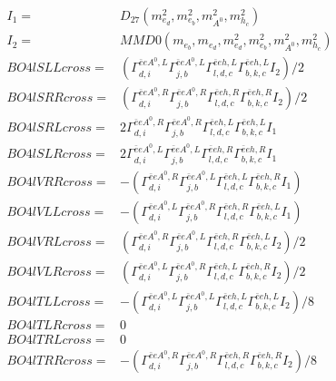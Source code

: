 \documentclass[A4,landscape]{article}
\begin{document}
\begin{align} 
I_1 = & D_{27}(m^2_{e_{{d}}}, m^2_{e_{{b}}}, m^2_{A^0}, m^2_{h_{{c}}}) \\ 
I_2 = & MMD0(m_{e_{{b}}}, m_{e_{{d}}}, m^2_{e_{{d}}}, m^2_{e_{{b}}}, m^2_{A^0}, m^2_{h_{{c}}}) \\ 
  BO4lSLLcross= & ( \Gamma^{\bar{e}e A^0 ,L}_{d, i} \Gamma^{\bar{e}e A^0 ,L}_{j, b} \Gamma^{\bar{e}e h ,L}_{l, d, c} \Gamma^{\bar{e}e h ,L}_{b, k, c} I_2)/2 \\ 
  BO4lSRRcross= & ( \Gamma^{\bar{e}e A^0 ,R}_{d, i} \Gamma^{\bar{e}e A^0 ,R}_{j, b} \Gamma^{\bar{e}e h ,R}_{l, d, c} \Gamma^{\bar{e}e h ,R}_{b, k, c} I_2)/2 \\ 
  BO4lSRLcross= & 2  \Gamma^{\bar{e}e A^0 ,R}_{d, i} \Gamma^{\bar{e}e A^0 ,R}_{j, b} \Gamma^{\bar{e}e h ,L}_{l, d, c} \Gamma^{\bar{e}e h ,L}_{b, k, c} I_1 \\ 
  BO4lSLRcross= & 2  \Gamma^{\bar{e}e A^0 ,L}_{d, i} \Gamma^{\bar{e}e A^0 ,L}_{j, b} \Gamma^{\bar{e}e h ,R}_{l, d, c} \Gamma^{\bar{e}e h ,R}_{b, k, c} I_1 \\ 
  BO4lVRRcross= & -( \Gamma^{\bar{e}e A^0 ,R}_{d, i} \Gamma^{\bar{e}e A^0 ,L}_{j, b} \Gamma^{\bar{e}e h ,L}_{l, d, c} \Gamma^{\bar{e}e h ,R}_{b, k, c} I_1) \\ 
  BO4lVLLcross= & -( \Gamma^{\bar{e}e A^0 ,L}_{d, i} \Gamma^{\bar{e}e A^0 ,R}_{j, b} \Gamma^{\bar{e}e h ,R}_{l, d, c} \Gamma^{\bar{e}e h ,L}_{b, k, c} I_1) \\ 
  BO4lVRLcross= & ( \Gamma^{\bar{e}e A^0 ,R}_{d, i} \Gamma^{\bar{e}e A^0 ,L}_{j, b} \Gamma^{\bar{e}e h ,R}_{l, d, c} \Gamma^{\bar{e}e h ,L}_{b, k, c} I_2)/2 \\ 
  BO4lVLRcross= & ( \Gamma^{\bar{e}e A^0 ,L}_{d, i} \Gamma^{\bar{e}e A^0 ,R}_{j, b} \Gamma^{\bar{e}e h ,L}_{l, d, c} \Gamma^{\bar{e}e h ,R}_{b, k, c} I_2)/2 \\ 
  BO4lTLLcross= & -( \Gamma^{\bar{e}e A^0 ,L}_{d, i} \Gamma^{\bar{e}e A^0 ,L}_{j, b} \Gamma^{\bar{e}e h ,L}_{l, d, c} \Gamma^{\bar{e}e h ,L}_{b, k, c} I_2)/8 \\ 
  BO4lTLRcross= & 0 \\ 
  BO4lTRLcross= & 0 \\ 
  BO4lTRRcross= & -( \Gamma^{\bar{e}e A^0 ,R}_{d, i} \Gamma^{\bar{e}e A^0 ,R}_{j, b} \Gamma^{\bar{e}e h ,R}_{l, d, c} \Gamma^{\bar{e}e h ,R}_{b, k, c} I_2)/8 \\ 
\end{align} 
\end{document}
